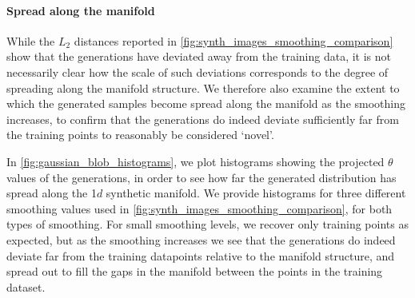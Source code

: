 \documentclass[10pt]{article}
\theoremstyle{plain}
\theoremstyle{definition}
\theoremstyle{remark}
\begin{document}
\paragraph{Spread along the manifold}
While the $L_2$ distances reported in \cref{fig:synth_images_smoothing_comparison} show that the generations have deviated away from the training data, it is not necessarily clear how the scale of such deviations corresponds to the degree of spreading along the manifold structure.
We therefore also examine the extent to which the generated samples become spread along the manifold as the smoothing increases, to confirm that the generations do indeed deviate sufficiently far from the training points to reasonably be considered `novel'.

In \cref{fig:gaussian_blob_histograms}, we plot histograms showing the projected $\theta$ values of the generations, in order to see how far the generated distribution has spread along the 1$d$ synthetic manifold. We provide histograms for three different smoothing values used in \cref{fig:synth_images_smoothing_comparison}, for both types of smoothing. For small smoothing levels, we recover only training points as expected, but as the smoothing increases we see that the generations do indeed deviate far from the training datapoints relative to the manifold structure, and spread out to fill the gaps in the manifold between the points in the training dataset.
\end{document}
